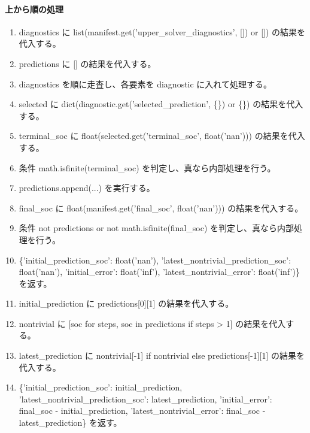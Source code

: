 \documentclass[a4paper,11pt]{article}
\begin{document}
            \paragraph{上から順の処理}
            \begin{enumerate}[leftmargin=1.8em]
            \item diagnostics に list(manifest.get('upper\_solver\_diagnostics', []) or []) の結果を代入する。
\item predictions に [] の結果を代入する。
\item diagnostics を順に走査し、各要素を diagnostic に入れて処理する。
\item   selected に dict(diagnostic.get('selected\_prediction', \{\}) or \{\}) の結果を代入する。
\item   terminal\_soc に float(selected.get('terminal\_soc', float('nan'))) の結果を代入する。
\item   条件 math.isfinite(terminal\_soc) を判定し、真なら内部処理を行う。
\item     predictions.append(...) を実行する。
\item final\_soc に float(manifest.get('final\_soc', float('nan'))) の結果を代入する。
\item 条件 not predictions or not math.isfinite(final\_soc) を判定し、真なら内部処理を行う。
\item   \{'initial\_prediction\_soc': float('nan'), 'latest\_nontrivial\_prediction\_soc': float('nan'), 'initial\_error': float('inf'), 'latest\_nontrivial\_error': float('inf')\} を返す。
\item initial\_prediction に predictions[0][1] の結果を代入する。
\item nontrivial に [soc for steps, soc in predictions if steps > 1] の結果を代入する。
\item latest\_prediction に nontrivial[-1] if nontrivial else predictions[-1][1] の結果を代入する。
\item \{'initial\_prediction\_soc': initial\_prediction, 'latest\_nontrivial\_prediction\_soc': latest\_prediction, 'initial\_error': final\_soc - initial\_prediction, 'latest\_nontrivial\_error': final\_soc - latest\_prediction\} を返す。
            \end{enumerate}
\end{document}
